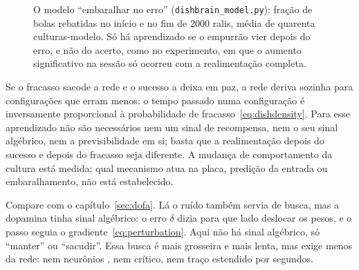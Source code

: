 \begin{figure}[t]
\centering
{}
\caption{O modelo ``embaralhar no erro'' (\texttt{dishbrain\_model.py}): fração de bolas rebatidas no início e no fim de $2000$ ralis, média de quarenta culturas-modelo. Só há aprendizado se o empurrão vier depois do erro, e não do acerto, como no experimento, em que o aumento significativo na sessão só ocorreu com a realimentação completa.}
\label{fig:dishmodel}
\end{figure}

\begin{keyblock}
\begin{proposition}
\label{prop:dishscramble}
Se o fracasso sacode a rede e o sucesso a deixa em paz, a rede deriva sozinha para configurações que erram menos: o tempo passado numa configuração é inversamente proporcional à probabilidade de fracasso~\eqref{eq:dishdensity}. Para esse aprendizado não são necessários nem um sinal de recompensa, nem o seu sinal algébrico, nem a previsibilidade em si; basta que a realimentação depois do sucesso e depois do fracasso seja diferente. A mudança de comportamento da cultura está medida; qual mecanismo atua na placa, predição da entrada ou embaralhamento, não está estabelecido.
\end{proposition}
\end{keyblock}

Compare com o capítulo~\ref{sec:dofa}. Lá o ruído também servia de busca, mas a dopamina tinha sinal algébrico: o erro $\delta$ dizia para que lado deslocar os pesos, e o passo seguia o gradiente~\eqref{eq:perturbation}. Aqui não há sinal algébrico, só ``manter'' ou ``sacudir''. Essa busca é mais grosseira e mais lenta, mas exige menos da rede: nem neurônios , nem crítico, nem traço estendido por segundos.

